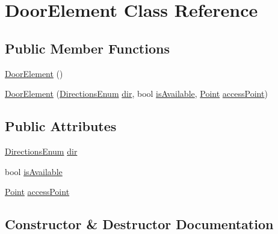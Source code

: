 \hypertarget{class_door_element}{}\section{Door\+Element Class Reference}
\label{class_door_element}
\subsection*{Public Member Functions}
\begin{DoxyCompactItemize}
\item 
\mbox{\hyperlink{class_door_element_a3813755af516f03d54a94c9b41f3a18f}{Door\+Element}} ()
\item 
\mbox{\hyperlink{class_door_element_af47025846529897bd7f91cb3a32cc89a}{Door\+Element}} (\mbox{\hyperlink{_directions_enum_8cs_a6bd1f747985f3fcfa3faca85ff3fd8e8}{Directions\+Enum}} \mbox{\hyperlink{class_door_element_a8c635d9ea1ced9ab8a31eba1423849fd}{dir}}, bool \mbox{\hyperlink{class_door_element_a987868b29274de148a1399cc43a497aa}{is\+Available}}, \mbox{\hyperlink{class_point}{Point}} \mbox{\hyperlink{class_door_element_a001885369ad05d140d4ce9652722002d}{access\+Point}})
\end{DoxyCompactItemize}
\subsection*{Public Attributes}
\begin{DoxyCompactItemize}
\item 
\mbox{\hyperlink{_directions_enum_8cs_a6bd1f747985f3fcfa3faca85ff3fd8e8}{Directions\+Enum}} \mbox{\hyperlink{class_door_element_a8c635d9ea1ced9ab8a31eba1423849fd}{dir}}
\item 
bool \mbox{\hyperlink{class_door_element_a987868b29274de148a1399cc43a497aa}{is\+Available}}
\item 
\mbox{\hyperlink{class_point}{Point}} \mbox{\hyperlink{class_door_element_a001885369ad05d140d4ce9652722002d}{access\+Point}}
\end{DoxyCompactItemize}


\subsection{Constructor \& Destructor Documentation}
\mbox{\label{class_door_element_a3813755af516f03d54a94c9b41f3a18f}} 
